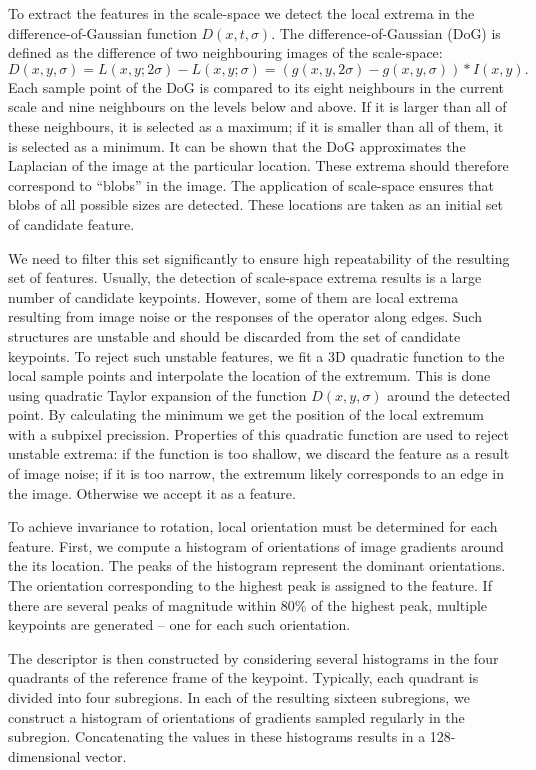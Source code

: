 To extract the features in the scale-space we detect the local extrema in the difference-of-Gaussian function $D(x, t, \sigma)$.
The difference-of-Gaussian (DoG) is defined as the difference of two neighbouring images of the scale-space: 
\[
 D(x, y, \sigma) = L(x, y; 2\sigma) - L(x, y; \sigma) = (g(x, y, 2\sigma) - g(x, y, \sigma)) * I(x, y).
\]
Each sample point of the DoG is compared to its eight neighbours in the current scale and nine neighbours on the levels below and above.
If it is larger than all of these neighbours, it is selected as a maximum; if it is smaller than all of them, it is selected as a minimum. 
It can be shown that the DoG approximates the Laplacian of the image at the particular location. 
These extrema should therefore correspond to ``blobs'' in the image.
The application of scale-space ensures that blobs of all possible sizes are detected. 
These locations are taken as an initial set of candidate feature. 

We need to filter this set significantly to ensure high repeatability of the resulting set of features. 
Usually, the detection of scale-space extrema results is a large number of candidate keypoints. 
However, some of them are local extrema resulting from image noise or the responses of the operator along edges. 
Such structures are unstable and should be discarded from the set of candidate keypoints.
To reject such unstable features, we fit a 3D quadratic function to the local sample points and interpolate the location of the extremum.
This is done using quadratic Taylor expansion of the function $D(x, y, \sigma)$ around the detected point.
By calculating the minimum we get the position of the local extremum with a subpixel precission.
Properties of this quadratic function are used to reject unstable extrema: if the function is too shallow, we discard the feature as a result of image noise; if it is too narrow, the extremum likely corresponds to an edge in the image.  
Otherwise we accept it as a feature.

To achieve invariance to rotation, local orientation must be determined for each feature. 
First, we compute a histogram of orientations of image gradients around the its location. 
The peaks of the histogram represent the dominant orientations. 
The orientation corresponding to the highest peak is assigned to the feature. 
If there are several peaks of magnitude within 80\% of the highest peak, multiple keypoints are generated -- one for each such orientation.

The descriptor is then constructed by considering several histograms in the four quadrants of the reference frame of the keypoint.
Typically, each quadrant is divided into four subregions. 
In each of the resulting sixteen subregions, we construct a histogram of orientations of gradients sampled regularly in the subregion. 
Concatenating the values in these histograms results in a 128-dimensional vector.

